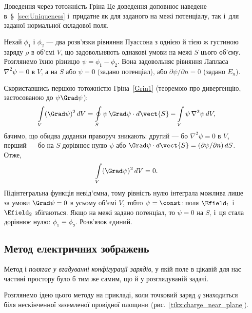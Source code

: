 \begin{Example}{Доведення через тотожність Гріна}
    Це доведення доповнює наведене в~\S~\ref{sec:Uniqueness} і~придатне як для заданого на межі потенціалу, так і~для заданої нормальної складової поля.

    Нехай $\phi_1$ і $\phi_2$ --- два розв'язки рівняння Пуассона з однією й тією ж густиною заряду $\rho$ в об'ємі $V$, що задовольняють однакові умови на межі $S$ цього об'єму. Розглянемо їхню різницю $\psi = \phi_1 - \phi_2$. Вона задовольняє рівняння Лапласа $\nabla^2\psi = 0$ в $V$, а на $S$ або $\psi = 0$ (задано потенціал), або $\partial\psi/\partial n = 0$ (задано $E_n$).

    Скориставшись першою тотожністю Гріна~\eqref{Grin1} (теоремою про дивергенцію, застосованою до $\psi\Grad\psi$):
    \begin{equation*}
        \int\limits_V (\Grad\psi)^2\, dV = \oint\limits_S \psi\,\Grad\psi \cdot d\vect{S} - \int\limits_V \psi\, \nabla^2\psi\, dV,
    \end{equation*}
    бачимо, що обидва доданки праворуч зникають: другий --- бо $\nabla^2\psi = 0$ в $V$, перший --- бо на $S$ дорівнює нулю $\psi$ або $\Grad\psi\cdot d\vect{S} = (\partial\psi/\partial n)\,dS$. Отже,
    \begin{equation*}
        \int\limits_V (\Grad\psi)^2\, dV = 0.
    \end{equation*}
    Підінтегральна функція невід'ємна, тому рівність нулю інтеграла можлива лише за умови $\Grad\psi = 0$ в усьому об'ємі $V$, тобто $\psi = \const$: поля $\Efield_1$ і~$\Efield_2$ збігаються. Якщо на межі задано потенціал, то $\psi = 0$ на $S$, і~ця стала дорівнює нулю: $\phi_1 \equiv \phi_2$. Розв'язок єдиний.
\end{Example}




\subsection*{Метод електричних зображень}


Метод  і \emph{полягає у вгадуванні конфігурації зарядів}, у якій поле в цікавій для нас частині простору було б
тим же самим, що й у розглядуваній задачі.


Розглянемо ідею цього методу на прикладі, коли точковий заряд $q$
знаходиться біля нескінченної заземленої провідної площини (рис.~\ref{tikz:charge_near_plane}).

